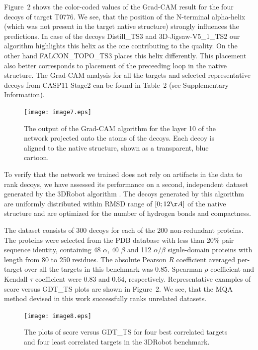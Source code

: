 \documentclass{bioinfo}
\begin{document}
Figure~2\vphantom{\ref{Fig:GradCAMT0776_more}} shows the color-coded
values of the Grad-CAM result for the four decoys of target T0776.
We see, that the position of the N-terminal alpha-helix (which was not present in the target native structure) 
strongly influences the predictions. In case of the decoys Distill\_TS3 and 3D-Jigsaw-V5\_1\_TS2 our algorithm 
highlights this helix as the one contributing to the quality. On the other hand FALCON\_TOPO\_TS3 places this helix 
differently. This placement also better corresponds to placement of the preceeding loop in the native structure.
The Grad-CAM analysis for all the targets and selected representative decoys from CASP11 Stage2 can be found in 
Table~2\vphantom{S4} (see Supplementary Information).
\begin{figure}[!tpb]
    \texttt{[image: image7.eps]}
    \caption{The output of the Grad-CAM algorithm for the layer 10 of the network
    projected onto the atoms of the decoys. Each decoy is aligned to
    the native structure, shown as a transparent, blue cartoon.}
    \label{Fig:GradCAMT0776_more}
\end{figure}

To verify that the network we trained does not rely on artifacts in
the data to rank decoys, we have assessed its performance on a second,
independent dataset generated by the 3DRobot
algorithm \citep{deng20163drobot}. The decoys generated by this
algorithm are uniformly distributed within RMSD range of $[0; 12\AA]$
of the native structure and are optimized for the number of hydrogen
bonds and compactness.

The dataset consists of 300 decoys for each of the 200 non-redundant proteins. The proteins were 
selected from the PDB database with less than 20\% pair sequence identity, containing 48 $\alpha$, 
40 $\beta$ and 112 $\alpha/\beta$ signle-domain proteins with length from 80 to 250 residues. 
The absolute Pearson $R$ coefficient averaged per-target over all the
targets in this benchmark was $0.85$. Spearman $\rho$ coefficient
and Kendall $\tau$ coefficient were $0.83$ and $0.64$, respectively.
Representative examples of score versus GDT\_TS plots are shown in
Figure~2\vphantom{\ref{Fig:3DRobotBenchmark}}.  We see, that the MQA method devised
in this work successfully ranks unrelated datasets.
\begin{figure}[!tpb]
    \centering
    \texttt{[image: image8.eps]}
    \caption{The plots of score versus GDT\_TS for four best correlated targets and four
    least correlated targets in the 3DRobot benchmark.}
    \label{Fig:3DRobotBenchmark}
\end{figure}
\end{document}
